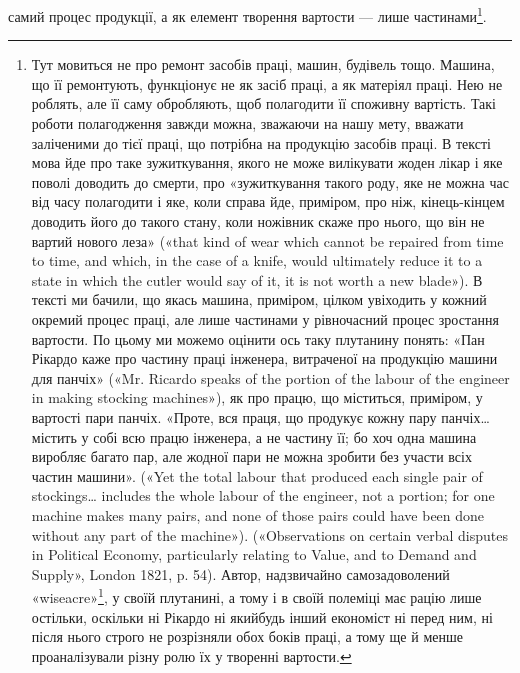\parcont{}  %
самий процес продукції, а як елемент творення вартости — лише
частинами\footnote{
Тут мовиться не про ремонт засобів праці, машин, будівель тощо.
Машина, що її ремонтують, функціонує не як засіб праці, а як матеріял
праці. Нею не роблять, але її саму обробляють, щоб полагодити її споживну
вартість. Такі роботи полагодження завжди можна, зважаючи
на нашу мету, вважати заліченими до тієї праці, що потрібна на продукцію
засобів праці. В тексті мова йде про таке зужиткування, якого не може
вилікувати жоден лікар і яке поволі доводить до смерти, про «зужиткування
такого роду, яке не можна час від часу полагодити і яке, коли справа
йде, приміром, про ніж, кінець-кінцем доводить його до такого стану,
коли ножівник скаже про нього, що він не вартий нового леза» («that
kind of wear which cannot be repaired from time to time, and which, in the
case of a knife, would ultimately reduce it to a state in which the cutler
would say of it, it is not worth a new blade»). В тексті ми бачили, що якась
машина, приміром, цілком увіходить у кожний окремий процес праці,
але лише частинами у рівночасний процес зростання вартости. По цьому
ми можемо оцінити ось таку плутанину понять: «Пан Рікардо каже про
частину праці інженера, витраченої на продукцію машини для панчіх»
(«Mr. Ricardo speaks of the portion of the labour of the engineer in making
stocking machines»), як про працю, що міститься, приміром, у вартості
пари панчіх. «Проте, вся праця, що продукує кожну пару панчіх\dots{} містить
у собі всю працю інженера, а не частину її; бо хоч одна машина виробляє
багато пар, але жодної пари не можна зробити без участи всіх частин
машини». («Yet the total labour that produced each single pair of stockings\dots{}
includes the whole labour of the engineer, not a portion; for one
machine makes many pairs, and none of those pairs could have been done
without any part of the machine»). («Observations on certain verbal disputes
in Political Economy, particularly relating to Value, and to Demand and
Supply», London 1821, p. 54). Автор, надзвичайно самозадоволений
«wiseacre»\footnote*{
— удаваний мудрак, самозадоволений дурень. \emph{Ред.}
}, у своїй плутанині, а тому і в своїй полеміці має рацію лише
остільки, оскільки ні Рікардо ні якийбудь інший економіст ні перед
ним, ні після нього строго не розрізняли обох боків праці, а тому ще
й менше проаналізували різну ролю їх у творенні вартости.
}.

